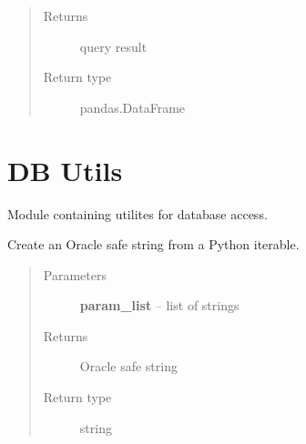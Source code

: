 \documentclass[letterpaper,10pt,english]{sphinxmanual}
\begin{document}
\begin{fulllineitems}
\begin{fulllineitems}
\begin{quote}
\begin{description}
\begin{itemize}
\end{itemize}

\item[{Returns}] \leavevmode
query result

\item[{Return type}] \leavevmode
pandas.DataFrame

\end{description}\end{quote}

\end{fulllineitems}


\end{fulllineitems}



\section{DB Utils}
\label{modules:db-utils}
Module containing utilites for database access.

\begin{fulllineitems}
\label{modules:webb_utils.db_utils.create_db_filter_str}
Create an Oracle safe string from a Python iterable.
\begin{quote}\begin{description}
\item[{Parameters}] \leavevmode
\textbf{param\_list} -- list of strings

\item[{Returns}] \leavevmode
Oracle safe string

\item[{Return type}] \leavevmode
string

\end{description}\end{quote}

\end{fulllineitems}

\end{document}
